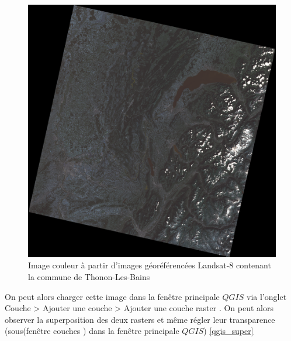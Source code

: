 \documentclass{book}
\begin{document}
\begin{figure}[H]
\begin{center}
\includegraphics[scale=0.4]{images/Thonon_landsat.png}
\end{center}
\caption{Image couleur à partir d'images géoréférencées Landsat-8 contenant la commune de Thonon-Les-Bains}
\label{Thonon-landsat}
\end{figure}

On peut alors charger cette image dans la fenêtre principale $QGIS$ via l'onglet \og Couche > Ajouter une couche > Ajouter une couche 
raster \fg{}. On peut alors observer la superposition des deux rasters et même régler leur transparence (sous(fen\^{e}tre \og couches \fg{}) 
dans la fen\^{e}tre principale $QGIS$) \ref{qgis_super}
\end{document}
